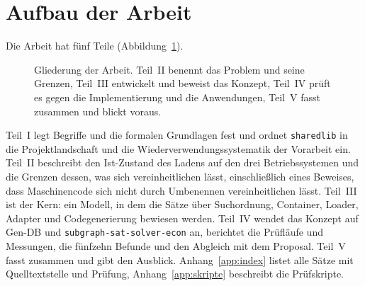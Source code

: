 \documentclass[a4paper,12pt,twoside]{report}
\DeclareRobustCommand{\_}{\ifmmode\mbox{\textunderscore}\else\textunderscore\allowbreak{}\fi}
\theoremstyle{definition}
\begin{document}
\section{Aufbau der Arbeit}

Die Arbeit hat fünf Teile (Abbildung~\ref{abb:gliederung}).

\begin{figure}[!ht]
    \centering
    \caption{Gliederung der Arbeit. Teil~II benennt das Problem und seine Grenzen, Teil~III entwickelt und beweist das Konzept, Teil~IV prüft es gegen die Implementierung und die Anwendungen, Teil~V fasst zusammen und blickt voraus.}
    \label{abb:gliederung}
\end{figure}

Teil~I legt Begriffe und die formalen Grundlagen fest und ordnet \texttt{sharedlib} in die Projektlandschaft und die Wiederverwendungssystematik der Vorarbeit ein. Teil~II beschreibt den Ist-Zustand des Ladens auf den drei Betriebssystemen und die Grenzen dessen, was sich vereinheitlichen lässt, einschließlich eines Beweises, dass Maschinencode sich nicht durch Umbenennen vereinheitlichen lässt. Teil~III ist der Kern: ein Modell, in dem die Sätze über Suchordnung, Container, Loader, Adapter und Codegenerierung bewiesen werden. Teil~IV wendet das Konzept auf Gen-DB und \texttt{subgraph-sat-solver-econ} an, berichtet die Prüfläufe und Messungen, die fünfzehn Befunde und den Abgleich mit dem Proposal. Teil~V fasst zusammen und gibt den Ausblick. Anhang~\ref{app:index} listet alle Sätze mit Quelltextstelle und Prüfung, Anhang~\ref{app:skripte} beschreibt die Prüfskripte.
\end{document}
